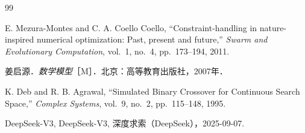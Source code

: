 \documentclass[withoutpreface,bwprint]{cumcmthesis} %
\begin{document}
\begin{thebibliography}{99}
	
	E. Mezura-Montes and C. A. Coello Coello,
	``Constraint-handling in nature-inspired numerical optimization: Past, present and future,''
	\textit{Swarm and Evolutionary Computation}, vol.~1, no.~4, pp.~173--194, 2011.
	
	姜启源．\textit{数学模型}［M］．北京：高等教育出版社，2007年．
	
	K. Deb and R. B. Agrawal,
	``Simulated Binary Crossover for Continuous Search Space,''
	\textit{Complex Systems}, vol.~9, no.~2, pp.~115--148, 1995.
	
	DeepSeek-V3, DeepSeek-V3, 深度求索（DeepSeek），2025-09-07.
	
\end{thebibliography}
\end{document}
